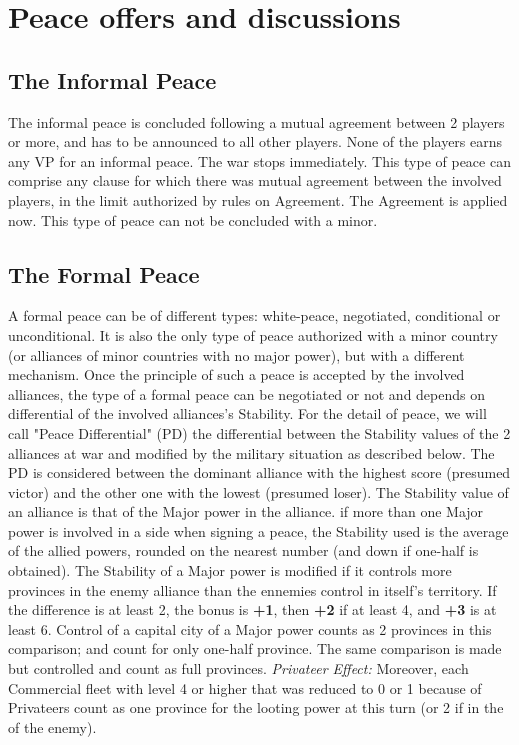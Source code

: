\section{Peace offers and discussions}\label{chPeace:Peace offers}
\subsection{The Informal Peace}

\aparag The informal peace is concluded following a mutual agreement between 2
players or more, and has to be announced to all other players.
\aparag[Consequences]
None of the players earns any VP for an informal peace. The war stops
immediately.
\bparag This type of peace can comprise any clause for which there was mutual
agreement between the involved players, in the limit authorized by rules on
Agreement. The Agreement is applied now.
\bparag This type of peace can not be concluded with a minor.



\subsection{The Formal Peace}

\aparag A formal peace can be of different types: white-peace, negotiated,
conditional or unconditional.
\bparag It is also the only type of peace authorized with a minor country (or
alliances of minor countries with no major power), but with a different
mechanism.
\bparag Once the principle of such a peace is accepted by the involved
alliances, the type of a formal peace can be negotiated or not and depends on
differential of the involved alliances's Stability.
For the detail of peace, we will call "Peace Differential" (PD) the
differential between the Stability values of the 2 alliances at war and
modified by the military situation as described below.  The PD is considered
between the dominant alliance with the highest score (presumed victor) and the
other one with the lowest (presumed loser). The Stability value of an alliance
is that of the Major power in the alliance.
if more than one Major power is involved in a side when signing a peace, the
Stability used is the average of the allied powers, rounded on the nearest
number (and down if one-half is obtained).
The Stability of a Major power is modified if it controls more provinces in
the enemy alliance than the ennemies control in itself's territory.  If the
difference is at least 2, the bonus is {\bf +1}, then {\bf +2} if at least 4,
and {\bf +3} is at least 6. Control of a capital city of a Major power counts
as 2 provinces in this comparison; \COL and \TP count for only one-half
province.
\label{chPeace:Privateer Effect}
The same comparison is made but controlled \COL and \TP count as full
provinces.  \textit{Privateer Effect:} Moreover, each Commercial fleet with
level 4 or higher that was reduced to 0 or 1 because of Privateers count as
one province for the looting power at this turn (or 2 if in the \CTZ of the
enemy).


